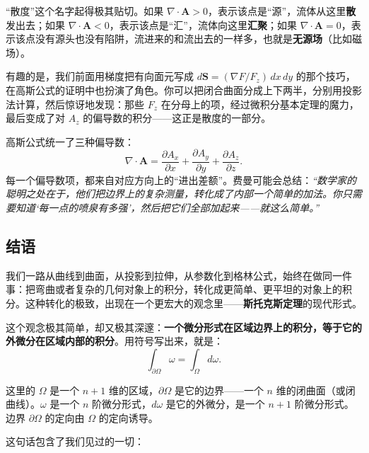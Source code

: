 \documentclass[UTF8]{ctexbook}
\begin{document}
“散度”这个名字起得极其贴切。如果 $\nabla \cdot \mathbf{A} > 0$，表示该点是“源”，流体从这里\textbf{散}发出去；如果 $\nabla \cdot \mathbf{A} < 0$，表示该点是“汇”，流体向这里\textbf{汇聚}；如果 $\nabla \cdot \mathbf{A} = 0$，表示该点没有源头也没有陷阱，流进来的和流出去的一样多，也就是\textbf{无源场}（比如磁场）。


有趣的是，我们前面用梯度把有向面元写成 $d\mathbf{S} = (\nabla F / F_z) \, dx\,dy$ 的那个技巧，在高斯公式的证明中也扮演了角色。你可以把闭合曲面分成上下两半，分别用投影法计算，然后惊讶地发现：那些 $F_z$ 在分母上的项，经过微积分基本定理的魔力，最后变成了对 $A_z$ 的偏导数的积分——这正是散度的一部分。

高斯公式统一了三种偏导数：
\[
\nabla \cdot \mathbf{A} = \frac{\partial A_x}{\partial x} + \frac{\partial A_y}{\partial y} + \frac{\partial A_z}{\partial z}.
\]
每一个偏导数项，都来自对应方向上的“进出差额”。费曼可能会总结：\emph{“数学家的聪明之处在于，他们把边界上的复杂测量，转化成了内部一个简单的加法。你只需要知道‘每一点的喷泉有多强’，然后把它们全部加起来——就这么简单。”}


\subsection{结语}

我们一路从曲线到曲面，从投影到拉伸，从参数化到格林公式，始终在做同一件事：把弯曲或者复杂的几何对象上的积分，转化成更简单、更平坦的对象上的积分。这种转化的极致，出现在一个更宏大的观念里——\textbf{斯托克斯定理}的现代形式。

这个观念极其简单，却又极其深邃：\textbf{一个微分形式在区域边界上的积分，等于它的外微分在区域内部的积分}。用符号写出来，就是：
\[
\int_{\partial \Omega} \omega = \int_{\Omega} d\omega.
\]

这里的 $\Omega$ 是一个 $n+1$ 维的区域，$\partial \Omega$ 是它的边界——一个 $n$ 维的闭曲面（或闭曲线）。$\omega$ 是一个 $n$ 阶微分形式，$d\omega$ 是它的外微分，是一个 $n+1$ 阶微分形式。边界 $\partial \Omega$ 的定向由 $\Omega$ 的定向诱导。

这句话包含了我们见过的一切：
\end{document}
